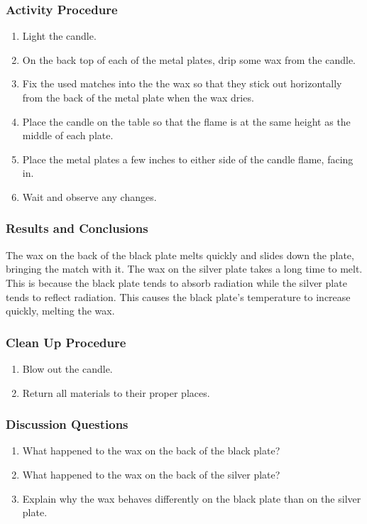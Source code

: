 \subsubsection*{Activity Procedure}
\begin{enumerate}
\item{Light the candle.}
\item{On the back top of each of the metal plates, drip some wax from the candle.}
\item{Fix the used matches into the the wax so that they stick out horizontally from the back of the metal plate when the wax dries.}
\item{Place the candle on the table so that the flame is at the same height as the middle of each plate.}
\item{Place the metal plates a few inches to either side of the candle flame, facing in.}
\item{Wait and observe any changes.}
\end{enumerate}

\subsubsection*{Results and Conclusions}
The wax on the back of the black plate melts quickly and slides down the plate, bringing the match with it.  The wax on the silver plate takes a long time to melt.  This is because the black plate tends to absorb radiation while the silver plate tends to reflect radiation.  This causes the black plate's temperature to increase quickly, melting the wax.

\subsubsection*{Clean Up Procedure}
\begin{enumerate}
\item{Blow out the candle.}
\item{Return all materials to their proper places.}
\end{enumerate}

\subsubsection*{Discussion Questions}
\begin{enumerate}
\item{What happened to the wax on the back of the black plate?}
\item{What happened to the wax on the back of the silver plate?}
\item{Explain why the wax behaves differently on the black plate than on the silver plate.}
\end{enumerate}

